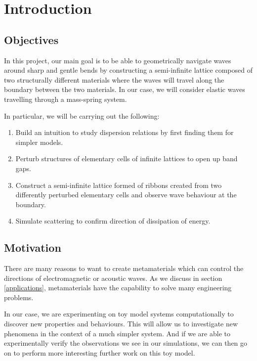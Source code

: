 \chapter{Introduction}

\section{Objectives}
In this project, our main goal is to be able to geometrically navigate waves
around sharp and gentle bends by constructing a semi-infinite lattice composed
of two structurally different materials where the waves will travel along the
boundary between the two materials. In our case, we will consider elastic waves
travelling through a mass-spring system.

In particular, we will be carrying out the following:

\begin{enumerate}
\item Build an intuition to study dispersion relations by first finding them
      for simpler models.
\item Perturb structures of elementary cells of infinite lattices to open up
      band gaps.
\item Construct a semi-infinite lattice formed of ribbons created from two
      differently perturbed elementary cells and observe wave behaviour at the
      boundary.
\item Simulate scattering to confirm direction of dissipation of energy.
\end{enumerate}

\section{Motivation}
There are many reasons to want to create metamaterials which can control the
directions of electromagnetic or acoustic waves. As we discuss in section
\ref{applications}, metamaterials have the capability to solve many engineering
problems.

In our case, we are experimenting on toy model systems computationally to
discover new properties and behaviours. This will allow us to investigate new
phenomena in the context of a much simpler system. And if we are able to
experimentally verify the observations we see in our simulations, we can then
go on to perform more interesting further work on this toy model.

